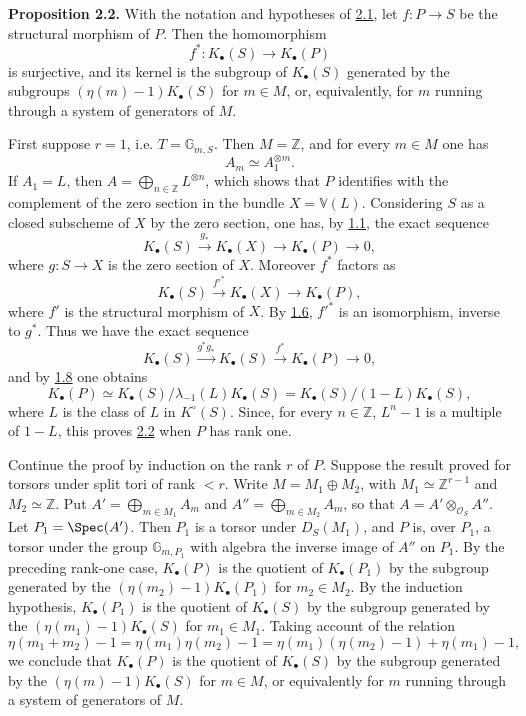 \textbf{Proposition 2.2.} With the notation and hypotheses of \hyperlink{sga6.e09.para.2-1}{2.1}, let $f:P\to S$ be the structural morphism of $P$. Then the homomorphism
\[
 f^*:K_\bullet(S)\longrightarrow K_\bullet(P)
\]
is surjective, and its kernel is the subgroup of $K_\bullet(S)$ generated by the subgroups $(\eta(m)-1)K_\bullet(S)$ for $m\in M$, or, equivalently, for $m$ running through a system of generators of $M$.

First suppose $r=1$, i.e. $T=\mathbb G_{m,S}$. Then $M=\mathbb Z$, and for every $m\in M$ one has
\[
 A_m\simeq A_1^{\otimes m}.
\]
If $A_1=L$, then $A=\bigoplus_{n\in\mathbb Z}L^{\otimes n}$, which shows that $P$ identifies with the complement of the zero section in the bundle $X=\mathbb V(L)$. Considering $S$ as a closed subscheme of $X$ by the zero section, one has, by \hyperlink{sga6.e09.prop.1-1}{1.1}, the exact sequence
\[
 K_\bullet(S)\xrightarrow{g_*}K_\bullet(X)\longrightarrow K_\bullet(P)\longrightarrow 0,
\]
where $g:S\to X$ is the zero section of $X$. Moreover $f^*$ factors as
\[
 K_\bullet(S)\xrightarrow{f'^*}K_\bullet(X)\longrightarrow K_\bullet(P),
\]
where $f'$ is the structural morphism of $X$. By \hyperlink{sga6.e09.prop.1-6}{1.6}, $f'^*$ is an isomorphism, inverse to $g^*$. Thus we have the exact sequence
\[
 K_\bullet(S)\xrightarrow{g^*g_*}K_\bullet(S)\xrightarrow{f^*}K_\bullet(P)\longrightarrow 0,
\]
and by \hyperlink{sga6.e09.prop.1-8}{1.8} one obtains
\[
 K_\bullet(P)\simeq K_\bullet(S)/\lambda_{-1}(L)K_\bullet(S)=K_\bullet(S)/(1-L)K_\bullet(S),
\]
where $L$ is the class of $L$ in $K^\circ(S)$. Since, for every $n\in\mathbb Z$, $L^n-1$ is a multiple of $1-L$, this proves \hyperlink{sga6.e09.prop.2-2}{2.2} when $P$ has rank one.

Continue the proof by induction on the rank $r$ of $P$. Suppose the result proved for torsors under split tori of rank $<r$. Write $M=M_1\oplus M_2$, with $M_1\simeq\mathbb Z^{r-1}$ and $M_2\simeq\mathbb Z$. Put $A'=\bigoplus_{m\in M_1}A_m$ and $A''=\bigoplus_{m\in M_2}A_m$, so that $A=A'\otimes_{\mathcal O_S}A''$.
Let $P_1=\Spec(A')$. Then $P_1$ is a torsor under $D_S(M_1)$, and $P$ is, over $P_1$, a torsor under the group $\mathbb G_{m,P_1}$ with algebra the inverse image of $A''$ on $P_1$. By the preceding rank-one case, $K_\bullet(P)$ is the quotient of $K_\bullet(P_1)$ by the subgroup generated by the $(\eta(m_2)-1)K_\bullet(P_1)$ for $m_2\in M_2$. By the induction hypothesis, $K_\bullet(P_1)$ is the quotient of $K_\bullet(S)$ by the subgroup generated by the $(\eta(m_1)-1)K_\bullet(S)$ for $m_1\in M_1$. Taking account of the relation
\[
 \eta(m_1+m_2)-1=\eta(m_1)\eta(m_2)-1
 =\eta(m_1)(\eta(m_2)-1)+\eta(m_1)-1,
\]
we conclude that $K_\bullet(P)$ is the quotient of $K_\bullet(S)$ by the subgroup generated by the $(\eta(m)-1)K_\bullet(S)$ for $m\in M$, or equivalently for $m$ running through a system of generators of $M$.

